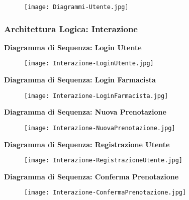 \begin{figure}[h!]
    \begin{center}
        \texttt{[image: Diagrammi-Utente.jpg]}
    \end{center}
\end{figure}
\hfill \break

\newpage
\subsubsection{Architettura Logica: Interazione}
\hfill \break

\textbf{Diagramma di Sequenza: Login Utente}

\begin{figure}[h!]
    \begin{center}
        \texttt{[image: Interazione-LoginUtente.jpg]}
    \end{center}
\end{figure}
\hfill \break

\textbf{Diagramma di Sequenza: Login Farmacista}

\begin{figure}[h!]
    \begin{center}
        \texttt{[image: Interazione-LoginFarmacista.jpg]}
    \end{center}
\end{figure}
\hfill \break

\textbf{Diagramma di Sequenza: Nuova Prenotazione}

\begin{figure}[h!]
    \begin{center}
        \texttt{[image: Interazione-NuovaPrenotazione.jpg]}
    \end{center}
\end{figure}
\newpage

\textbf{Diagramma di Sequenza: Registrazione Utente}

\begin{figure}[h!]
    \begin{center}
        \texttt{[image: Interazione-RegistrazioneUtente.jpg]}
    \end{center}
\end{figure}
\hfill \break

\textbf{Diagramma di Sequenza: Conferma Prenotazione}

\begin{figure}[h!]
    \begin{center}
        \texttt{[image: Interazione-ConfermaPrenotazione.jpg]}
    \end{center}
\end{figure}
\newpage

